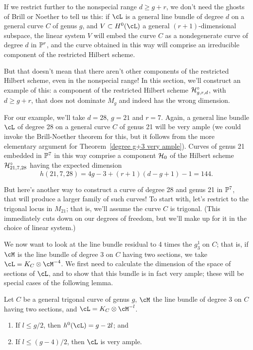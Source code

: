 If we restrict further to the nonspecial range $d \geq g + r$, we don't need the ghosts of Brill or Noether to tell us this: if $\cL$ is a general line bundle of degree $d$ on a general curve $C$ of genus $g$, and $V \subset H^0(\cL)$ a general $(r+1)$-dimensional subspace, the linear system $V$ will embed the curve $C$ as a nondegenerate curve of degree $d$ in $\PP^{r}$, and the curve obtained in this way will comprise an irreducible component of the restricted Hilbert scheme.

But that doesn't mean that there aren't other components of the restricted Hilbert scheme, even in the nonspecial range! In this section, we'll construct an example of this: a component of the restricted Hilbert scheme $\cH^\circ_{g,r,d}$, with $d \geq g+r$, that does not dominate $M_g$ and indeed has the wrong dimension.

For our example, we'll take $d = 28$, $g = 21$ and $r=7$. Again, a general line bundle $\cL$ of degree 28 on a general curve $C$ of genus 21 will be very ample (we could invoke the Brill-Noether theorem for this, but it follows from the more elementary argument for Theorem~\ref{degree g+3 very ample}). Curves of genus 21 embedded in $\PP^7$ in this way comprise a component $\cH_0$ of the Hilbert scheme $\cH^\circ_{21, 7, 28}$ having the expected dimension
$$
h(21, 7, 28) = 4g-3 + (r+1)(d-g+1) - 1 = 144.
$$

But here's another way to construct a curve of degree 28 and genus 21 in $\PP^7$, that will produce a larger family of such curves! To start with, let's restrict to the trigonal locus in $M_{21}$; that is, we'll assume the curve $C$ is trigonal. (This immediately cuts down on our degrees of freedom, but we'll make up for it in the choice of linear system.)

We now want to look at the line bundle residual to 4 times the $g^1_3$ on $C$; that is, if $\cM$ is the line bundle of degree 3 on $C$ having two sections, we take $\cL = K_C \otimes \cM^{-4}$. We first need to calculate the dimension of the space of sections of $\cL$, and to show that this bundle is in fact very ample; these will be special cases of the following lemma.

\begin{lemma}
Let $C$ be a general trigonal curve of genus $g$, $\cM$  the line bundle of degree 3 on $C$ having two sections, and $\cL = K_C \otimes \cM^{-l}$.
\begin{enumerate}
\item If $l \leq g/2$, then $h^0(\cL) = g - 2l$; and
\item If $l \leq (g-4)/2$, then $\cL$ is very ample.
\end{enumerate}
\end{lemma}


